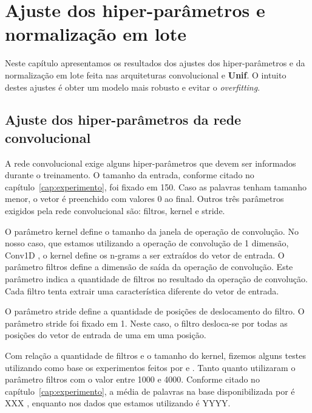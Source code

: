 \chapter{Ajuste dos hiper-parâmetros e normalização em lote}
\label{cap:ajuste-hiper-parametros-cnn}

Neste capítulo apresentamos os resultados dos ajustes dos hiper-parâmetros e da normalização em lote feita nas arquiteturas convolucional e \textbf{Unif}. O intuito destes ajustes é obter um modelo mais robusto e evitar o \textit{overfitting}.

\section{Ajuste dos hiper-parâmetros da rede convolucional}
\label{sec:ajuste-hiper-parametros-cnn}

A rede convolucional exige alguns hiper-parâmetros que devem ser informados durante o treinamento. O tamanho da entrada, conforme citado no capítulo~\ref{cap:experimento}, foi fixado em 150. Caso as palavras tenham tamanho menor, o vetor é preenchido com valores $0$ ao final. Outros três parâmetros exigidos pela rede convolucional são: filtros, kernel e stride.

O parâmetro kernel define o tamanho da janela de operação de convolução. No nosso caso, que estamos utilizando a operação de convolução de 1 dimensão, Conv1D , o kernel define os n-grams a ser extraídos do vetor de entrada. 
O parâmetro filtros define a dimensão de saída da operação de convolução. Este parâmetro indica a quantidade de filtros no resultado da operação de convolução. Cada filtro tenta extrair uma característica diferente do vetor de entrada.

O parâmetro stride define a quantidade de posições de deslocamento do filtro. O parâmetro stride foi fixado em 1. Neste caso, o filtro desloca-se por todas as posições do vetor de entrada de uma em uma posição.

Com relação a quantidade de filtros e o tamanho do kernel, fizemos alguns testes utilizando como base os experimentos feitos por \cite{feng-2015} e \cite{tan-lstm-qa}. Tanto \cite{feng-2015} quanto \cite{tan-lstm-qa} utilizaram o parâmetro filtros com o valor entre 1000 e 4000. Conforme citado no capítulo~\ref{cap:experimento}, a média de palavras na base disponibilizada por \cite{feng-2015} é XXX , enquanto nos dados que estamos utilizando é YYYY. 

